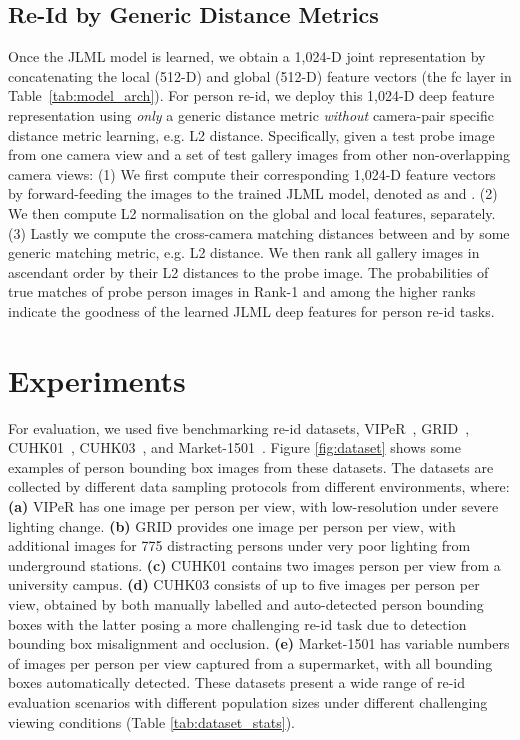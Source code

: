 \documentclass{article}
\begin{document}
\subsection{Re-Id by Generic Distance Metrics}
{Once the JLML model is learned, 
we obtain a 1,024-D joint representation
by concatenating the local (512-D) and global (512-D) feature vectors
(the fc layer in Table~\ref{tab:model_arch}).}
For person
re-id, we deploy this 1,024-D deep feature representation using {\em only}
a generic distance metric {\em without} camera-pair specific distance
metric learning, e.g. L2 distance.
Specifically, given a test probe image  from one camera view
and a set of test gallery images 
 from other non-overlapping camera views:
(1) We first compute their corresponding 1,024-D feature vectors by
forward-feeding the images to the trained JLML model, 
denoted as  and 
. 
(2) We then compute L2 normalisation on the global and local features,
separately. (3) Lastly we compute the cross-camera matching
distances between  and  by some generic matching
metric, e.g. L2 distance. We then rank all
gallery images in ascendant order by their L2 distances to the probe image.  
The probabilities of true matches of probe person images in Rank-1 and
among the higher ranks indicate the goodness of the learned
JLML deep features for person re-id tasks. 




\section{Experiments}








For evaluation, we used five benchmarking re-id datasets,
VIPeR~\cite{ELF_ECCV08}, 
GRID~\cite{loy2009multi},
CUHK01~\cite{li2012human}, 
CUHK03~\cite{li2014deepreid}, and 
Market-1501~\cite{zheng2015scalable}.   
Figure \ref{fig:dataset} shows some examples of person bounding box
images from these datasets.
The datasets are collected by different data sampling protocols
from different environments, where: 
{\bf (a)} VIPeR has one image per person per view,
with low-resolution under severe lighting change.
{\bf (b)} GRID provides one image per person per view, with additional
images for 775 distracting persons under very poor lighting from underground stations.
{\bf (c)} CUHK01 contains two images person per view from a university campus.
{\bf (d)} CUHK03 consists of up to five images per person per view,
obtained by both manually labelled and auto-detected person bounding
boxes with the latter posing a more challenging re-id task due to
detection bounding box misalignment and occlusion. 
{\bf (e)} Market-1501 has variable numbers of images per person per
view captured from a supermarket, with all bounding boxes
automatically detected. 
These datasets present a wide range of re-id evaluation scenarios with
different population sizes under different challenging viewing
conditions (Table \ref{tab:dataset_stats}).
\end{document}
